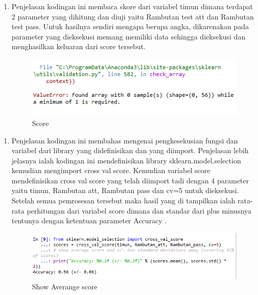 \begin{enumerate}
\item Penjelasan kodingan ini membaca skore dari variabel timun dimana terdapat 2 parameter yang dihitung dan diuji yaitu Rambutan test att dan Rambutan test pass. Untuk hasilnya sendiri mengapa berupa angka, dikarenakan pada parameter yang dieksekusi memang memiliki data sehingga dieksekusi dan menghasilkan keluaran dari score tersebut.
\begin{figure}[ht]
\centering
\includegraphics[scale=0.5]{figures/no8.png}
\caption{Score}
\label{Hasil}
\end{figure}
\end{enumerate}

\begin{enumerate}
\item Penjelasan kodingan ini membahas mengenai pengkesekusian fungsi dan variabel dari library yang didefinisikan dan yang diimport. Penjelasan lebih jelasnya ialah kodingan ini mendefinisikan library sklearn.model.selection kemudian mengimport cross val score. Kemudian variabel score mendefinisikan cross val score yang telah diimport tadi dengan 4 parameter yaitu timun, Rambutan att, Rambutan pass dan cv=5 untuk dieksekusi. Setelah semua pemrosesan tersebut maka hasil yang di tampilkan ialah rata-rata perhitungan dari variabel score dimana dan standar dari plus minusnya tentunya dengan ketentuan parameter Accuracy .
\begin{figure}[ht]
\centering
\includegraphics[scale=0.5]{figures/no9.png}
\caption{Show Averange score}
\label{Hasil}
\end{figure}
\end{enumerate}

